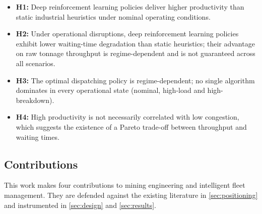 \documentclass[11pt,a4paper]{article}
\begin{document}
\begin{itemize}
  \item \textbf{H1:} Deep reinforcement learning policies deliver higher productivity than static industrial heuristics under nominal operating conditions.
  \item \textbf{H2:} Under operational disruptions, deep reinforcement learning policies exhibit lower waiting-time degradation than static heuristics; their advantage on raw tonnage throughput is regime-dependent and is not guaranteed across all scenarios.
  \item \textbf{H3:} The optimal dispatching policy is regime-dependent; no single algorithm dominates in every operational state (nominal, high-load and high-breakdown).
  \item \textbf{H4:} High productivity is not necessarily correlated with low congestion, which suggests the existence of a Pareto trade-off between throughput and waiting times.
\end{itemize}

\subsection{Contributions}
\label{sec:contributions}

This work makes four contributions to mining engineering and intelligent fleet management. They are defended against the existing literature in \cref{sec:positioning} and instrumented in \cref{sec:design} and \cref{sec:results}.
\end{document}
